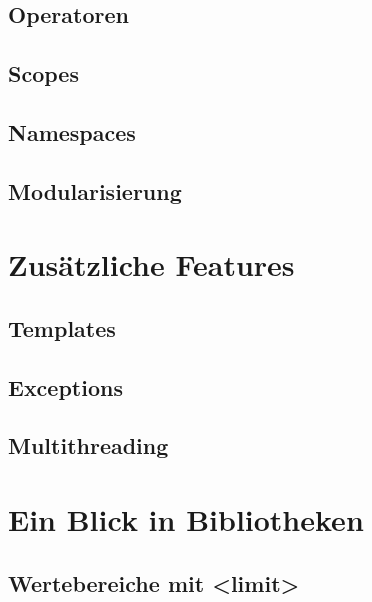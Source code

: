 \documentclass[a4paper]{report}
\begin{document}
\section{Operatoren}


\section{Scopes}

\section{Namespaces}


\section{Modularisierung}



\chapter{Zusätzliche Features}
\section{Templates}
\section{Exceptions}
\section{Multithreading}

\chapter{Ein Blick in Bibliotheken}

\section{Wertebereiche mit <limit>}

	
	
\end{document}
